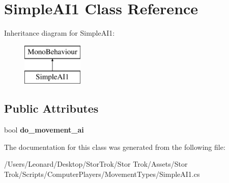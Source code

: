 \hypertarget{class_simple_a_i1}{}\section{Simple\+A\+I1 Class Reference}
\label{class_simple_a_i1}
Inheritance diagram for Simple\+A\+I1\+:\begin{figure}[H]
\begin{center}
\leavevmode
\includegraphics[height=2.000000cm]{class_simple_a_i1}
\end{center}
\end{figure}
\subsection*{Public Attributes}
\begin{DoxyCompactItemize}
\item 
\mbox{\label{class_simple_a_i1_a570b503a7669c992d2326b238e5cdb6c}} 
bool {\bfseries do\+\_\+movement\+\_\+ai}
\end{DoxyCompactItemize}


The documentation for this class was generated from the following file\+:\begin{DoxyCompactItemize}
\item 
/\+Users/\+Leonard/\+Desktop/\+Stor\+Trok/\+Stor Trok/\+Assets/\+Stor Trok/\+Scripts/\+Computer\+Players/\+Movement\+Types/Simple\+A\+I1.\+cs\end{DoxyCompactItemize}
